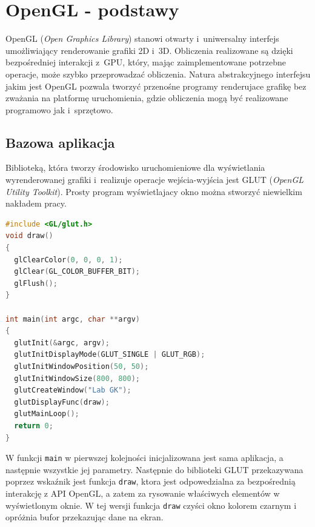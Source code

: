 \section{OpenGL - podstawy}

OpenGL (\textit{Open Graphics Library}) stanowi otwarty i~uniwersalny interfejs umożliwiający renderowanie grafiki 2D i~3D. Obliczenia realizowane są dzięki bezpośredniej interakcji z~GPU, który, mając zaimplementowane potrzebne operacje, może szybko przeprowadzać obliczenia. Natura abstrakcyjnego interfejsu jakim jest OpenGL pozwala tworzyć przenośne programy renderujace grafikę bez zważania na platformę uruchomienia, gdzie obliczenia mogą być realizowane programowo jak i~sprzętowo.

\subsection{Bazowa aplikacja}
Biblioteką, która tworzy środowisko uruchomieniowe dla wyświetlania wyrenderowanej grafiki i~realizuje operacje wejścia-wyjścia jest GLUT (\textit{OpenGL Utility Toolkit}). Prosty program wyświetlajacy okno można stworzyć niewielkim nakładem pracy.

\begin{lstlisting}[language=C++, caption=Bazowy program wyświetlający czarne okno.]
#include <GL/glut.h>
void draw()
{
  glClearColor(0, 0, 0, 1);
  glClear(GL_COLOR_BUFFER_BIT);
  glFlush();
}

int main(int argc, char **argv)
{
  glutInit(&argc, argv);
  glutInitDisplayMode(GLUT_SINGLE | GLUT_RGB);
  glutInitWindowPosition(50, 50);
  glutInitWindowSize(800, 800);
  glutCreateWindow("Lab GK");
  glutDisplayFunc(draw);
  glutMainLoop();
  return 0;
}
\end{lstlisting}

W funkcji \lstinline{main} w pierwszej kolejności inicjalizowana jest sama aplikacja, a następnie wszystkie jej parametry. Następnie do biblioteki GLUT przekazywana poprzez wskaźnik jest funkcja \lstinline{draw}, ktora jest odpowedzialna za bezpośrednią interakcję z API OpenGL, a zatem za rysowanie właściwych elementów w wyświetlonym oknie. W tej wersji funkcja \lstinline{draw} czyści okno kolorem czarnym i opróżnia bufor przekazując dane na ekran.


